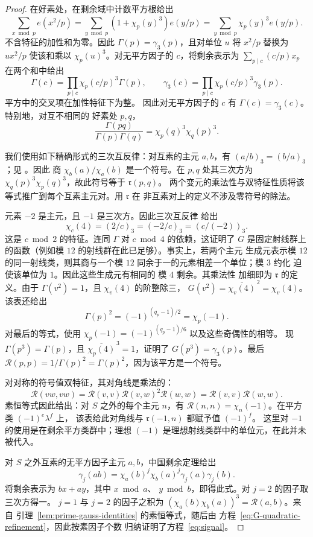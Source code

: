 \begin{proof}
在好素处，在剩余域中计数平方根给出
\[
 \sum_{x\bmod p}e(x^2/p)
 =\sum_{y\bmod p}(1+\chi_p(y)^3)e(y/p)
 =\sum_{y\bmod p}\chi_p(y)^3e(y/p).
\]
不含特征的加性和为零。因此
$\Gamma(p)=\gamma_3(p)$，且对单位 $u$ 将 $x^2/p$ 替换为 $ux^2/p$
使该和乘以 $\chi_p(u)^3$。对无平方因子的 $c$，将剩余表示为
$\sum_{p\mid c}(c/p)x_p$ 在两个和中给出
\[
 \Gamma(c)=\prod_{p\mid c}\chi_p(c/p)^3\Gamma(p),\qquad
 \gamma_3(c)=\prod_{p\mid c}\chi_p(c/p)^3\gamma_3(p).
\]
平方中的交叉项在加性特征下为整。
因此对无平方因子的 $c$ 有 $\Gamma(c)=\gamma_3(c)$。特别地，对互不相同的
好素处 $p,q$，
\[
 \frac{\Gamma(pq)}{\Gamma(p)\Gamma(q)}
 =\chi_p(q)^3\chi_q(p)^3.
\]

我们使用如下精确形式的三次互反律：对互素的主元
$a,b$，有 $(a/b)_3=(b/a)_3$；见 \cite[方程 (1.4)]{DR}。因此
商 $\chi_b(a)/\chi_a(b)$ 是一个符号。在 $p,q$ 处其三次方为
$\chi_q(p)^3\chi_p(q)^3$，故此符号等于 $\mathfrak r(p,q)$。
两个变元的乘法性与双特征性质将该
等式推广到每个互素主元对。用 $\mathfrak r$ 在
非互素对上的定义不涉及零符号的除法。

元素 $-2$ 是主元，且 $-1$ 是三次方。因此三次互反律
给出
\[
 \chi_c(4)=(2/c)_3=(-2/c)_3=(c/(-2))_3.
\]
这是 $c\bmod2$ 的特征。连同 $\Gamma$ 对
$c\bmod4$ 的依赖，这证明了 $G$ 是固定射线群上的函数（例如模 $12$
的射线群在此已足够）。事实上，若两个主元
生成元表示模 $12$ 的同一射线类，则其商与一个模 $12$
同余于一的元素相差一个单位；模 $3$ 约化
迫使该单位为 $1$。因此这些生成元有相同的
模 $4$ 剩余。其乘法性
加细即为 $\mathfrak r$ 的定义。由于
$\Gamma(v^2)=1$，且 $\chi_v(4)$ 的阶整除三，
$G(v^2)=\overline{\chi_v(4)}^{\,2}=\chi_v(4)$。该表还给出
\[
 \Gamma(p)^2=(-1)^{(q_p-1)/2}=\chi_p(-1).
\]
对最后的等式，使用
$\chi_p(-1)=(-1)^{(q_p-1)/6}$ 以及这些奇偶性的相等。
现 $\Gamma(p^3)=\Gamma(p)$，且
$\overline{\chi_p(4)}^{\,3}=1$，证明了 $G(p^3)=\gamma_3(p)$。最后
$\mathcal R(p,p)=1/\Gamma(p)^2=\Gamma(p)^2$，因为该平方是一个符号。

对对称的符号值双特征，其对角线是乘法的：
\[
 \mathcal R(vw,vw)
 =\mathcal R(v,v)\mathcal R(v,w)^2\mathcal R(w,w)
 =\mathcal R(v,v)\mathcal R(w,w).
\]
素恒等式因此给出：对 $S$ 之外的每个主元
$n$，有 $\mathcal R(n,n)=\chi_n(-1)$。在平方类 $(-1)^e\lambda^f$ 上，
该表给此对角线与 $\mathfrak r(-1,n)$ 都赋予值 $(-1)^f$。
这里对 $-1$ 的使用是在剩余平方类群中；理想 $(-1)$
是理想射线类群中的单位元，在此并未被代入。

对 $S$ 之外互素的无平方因子主元 $a,b$，中国剩余定理给出
\[
 \gamma_j(ab)=\chi_a(b)^j\chi_b(a)^j\gamma_j(a)\gamma_j(b).
\]
将剩余表示为 $bx+ay$，其中 $x\bmod a$、
$y\bmod b$，即得此式。对 $j=2$ 的因子取三次方得一。
$j=1$ 与 $j=2$ 的因子之积为
$(\chi_a(b)\chi_b(a))^3=\mathcal R(a,b)$。来自
引理~\ref{lem:prime-gauss-identities} 的素恒等式，随后由
方程~\eqref{eq:G-quadratic-refinement}，因此按素因子个数
归纳证明了方程~\eqref{eq:signal}。
\end{proof}

